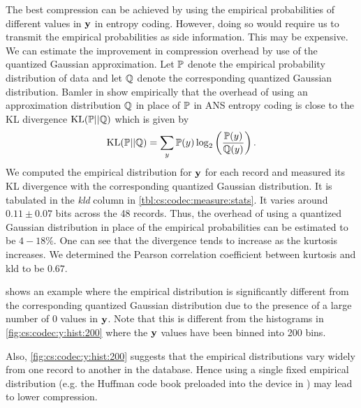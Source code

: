 The best compression can be achieved by using the empirical
probabilities of different values in $\mathbf{y}$ in entropy coding.
However, doing so would require us to transmit the empirical
probabilities as side information. This may be expensive.
We can estimate the improvement in compression overhead
by use of the quantized Gaussian approximation.
Let $\mathbb{P}$ denote the empirical probability distribution
of data and let $\mathbb{Q}$ denote the corresponding
quantized Gaussian distribution. Bamler in \cite{bamler2022constriction}
show empirically that the overhead of using an approximation
distribution $\mathbb{Q}$ in place of $\mathbb{P}$ in ANS entropy coding
is close to the KL divergence $\text{KL}(\mathbb{P} || \mathbb{Q})$
which is given by
\begin{equation}
\text{KL}(\mathbb{P} || \mathbb{Q}) = \sum_y \mathbb{P}(y) \log_2\left (\frac{\mathbb{P}(y)}{\mathbb{Q}(y)} \right).
\end{equation}
We computed the empirical distribution for $\mathbf{y}$ for each
record and measured its KL divergence with the corresponding
quantized Gaussian distribution.
It is tabulated in the \emph{kld} column in \cref{tbl:cs:codec:measure:stats}.
It varies around $0.11 \pm 0.07$ bits
across the 48 records.
Thus, the overhead of using a quantized
Gaussian distribution in place of the empirical probabilities
can be estimated to be $4-18\%$.
One can see that the divergence tends to increase as the
kurtosis increases. We determined the Pearson correlation
coefficient between kurtosis and kld to be $0.67$.

 shows an example
where the empirical distribution is significantly different
from the corresponding quantized Gaussian distribution
due to the presence of a large
number of $0$ values in $\mathbf{y}$. Note that this is different
from the histograms in \cref{fig:cs:codec:y:hist:200} where
the $\mathbf{y}$ values have been binned into 200 bins.

Also, \cref{fig:cs:codec:y:hist:200} suggests that the empirical
distributions vary widely from one record to another in the
database. Hence using a single fixed empirical distribution
(e.g. the Huffman code book preloaded into the device in
\cite{mamaghanian2011compressed})
may lead to lower compression.



